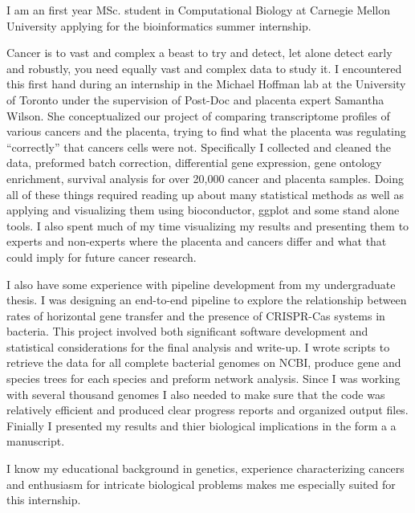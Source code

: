 \documentclass[11pt, a4paper]{./Awesome-CV/awesome-cv}
\begin{document}
\vspace*{\fill}
\makelettertitle %

\begin{cvletter}
\hspace{8mm} I am an first year MSc. student in Computational Biology at Carnegie Mellon University applying for the bioinformatics summer internship.
\par \hspace{8mm}
Cancer is to vast and complex a beast to try and detect, let alone detect early and robustly, you need equally vast and complex data to study it.
I encountered this first hand during an internship in the Michael Hoffman lab at the University of Toronto under the supervision of Post-Doc and placenta expert Samantha Wilson.
She conceptualized our project of comparing transcriptome profiles of various cancers and the placenta, trying to find what the placenta was regulating “correctly” that cancers cells were not.
Specifically I collected and cleaned the data, preformed batch correction, differential gene expression, gene ontology enrichment, survival analysis for over 20,000 cancer and placenta samples.
Doing all of these things required reading up about many statistical methods as well as applying and visualizing them using bioconductor, ggplot and some stand alone tools.
I also spent much of my time visualizing my results and presenting them to experts and non-experts where the placenta and cancers differ and what that could imply for future cancer research.
\par \hspace{8mm}
I also have some experience with pipeline development from my undergraduate thesis.
I was designing an end-to-end pipeline to explore the relationship between rates of horizontal gene transfer and the presence of CRISPR-Cas systems in bacteria.
This project involved both significant software development and statistical considerations for the final analysis and write-up.
I wrote scripts to retrieve the data for all complete bacterial genomes on NCBI, produce gene and species trees for each species and preform network analysis.
Since I was working with several thousand genomes I also needed to make sure that the code was relatively efficient and produced clear progress reports and organized output files.
Finially I presented my results and thier biological implications in the form a a manuscript.
\par \hspace{8mm}
I know my educational background in genetics, experience characterizing cancers and enthusiasm for intricate biological problems makes me especially suited for this internship.

\end{cvletter}
\makeletterclosing
\vspace*{\fill}
\end{document}
